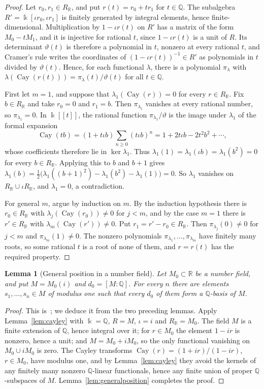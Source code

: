 \documentclass[10pt]{article}
\newtheorem{lem}[thm]{Lemma}
\theoremstyle{remark}
\newcommand{\R}{\mathbb R}
\newcommand{\Q}{\mathbb Q}
\DeclareMathOperator{\Cay}{Cay}
\begin{document}
\begin{proof}
Let $r_0,r_1\in R_\R$, and put $r(t)=r_0+tr_1$ for $t\in\Q$. The subalgebra $R'=\Bbbk[\iota r_0,\iota r_1]$ is finitely generated by integral elements, hence finite-dimensional. Multiplication by $1-\iota r(t)$ on $R'$ has a matrix of the form $M_0-tM_1$, and it is injective for rational $t$, since $1-\iota r(t)$ is a unit of $R$. Its determinant $\vartheta(t)$ is therefore a polynomial in $t$, nonzero at every rational $t$, and Cramer's rule writes the coordinates of $(1-\iota r(t))^{-1}\in R'$ as polynomials in $t$ divided by $\vartheta(t)$. Hence, for each functional $\lambda$, there is a polynomial $\pi_\lambda$ with $\lambda(\Cay(r(t)))=\pi_\lambda(t)/\vartheta(t)$ for all $t\in\Q$.

First let $m=1$, and suppose that $\lambda_1(\Cay(r))=0$ for every $r\in R_\R$. Fix $b\in R_\R$ and take $r_0=0$ and $r_1=b$. Then $\pi_{\lambda_1}$ vanishes at every rational number, so $\pi_{\lambda_1}=0$. In $\Bbbk[[t]]$, the rational function $\pi_{\lambda_1}/\vartheta$ is the image under $\lambda_1$ of the formal expansion
\[
 \Cay(tb)=(1+t\iota b)\sum_{n\ge0}(t\iota b)^n=1+2t\iota b-2t^2b^2+\cdots,
\]
whose coefficients therefore lie in $\ker\lambda_1$. Thus $\lambda_1(1)=\lambda_1(\iota b)=\lambda_1(b^2)=0$ for every $b\in R_\R$. Applying this to $b$ and $b+1$ gives $\lambda_1(b)=\frac12\bigl(\lambda_1((b+1)^2)-\lambda_1(b^2)-\lambda_1(1)\bigr)=0$. So $\lambda_1$ vanishes on $R_\R\cup\iota R_\R$, and $\lambda_1=0$, a contradiction.

For general $m$, argue by induction on $m$. By the induction hypothesis there is $r_0\in R_\R$ with $\lambda_j(\Cay(r_0))\ne0$ for $j<m$, and by the case $m=1$ there is $r'\in R_\R$ with $\lambda_m(\Cay(r'))\ne0$. Put $r_1=r'-r_0\in R_\R$. Then $\pi_{\lambda_j}(0)\ne0$ for $j<m$ and $\pi_{\lambda_m}(1)\ne0$. The nonzero polynomials $\pi_{\lambda_1},\ldots,\pi_{\lambda_m}$ have finitely many roots, so some rational $t$ is a root of none of them, and $r=r(t)$ has the required property.
\end{proof}


\begin{lem}[General position in a number field]\label{lem:numberfield}
Let $M_0\subset\R$ be a number field, and put $M=M_0(i)$ and $d_0=[M:\Q]$. For every $n$ there are elements $s_1,\ldots,s_n\in M$ of modulus one such that every $d_0$ of them form a $\Q$-basis of $M$.
\end{lem}

\begin{proof}
This is~\cite[Lemma~3.4]{OAI}; we deduce it from the two preceding lemmas. Apply Lemma~\ref{lem:cayley} with $\Bbbk=\Q$, $R=M$, $\iota=i$ and $R_\R=M_0$. The field $M$ is a finite extension of $\Q$, hence integral over it; for $r\in M_0$ the element $1-ir$ is nonzero, hence a unit; and $M=M_0+iM_0$, so the only functional vanishing on $M_0\cup iM_0$ is zero. The Cayley transforms $\Cay(r)=(1+ir)/(1-ir)$, $r\in M_0$, have modulus one, and by Lemma~\ref{lem:cayley} they avoid the kernels of any finitely many nonzero $\Q$-linear functionals, hence any finite union of proper $\Q$-subspaces of $M$. Lemma~\ref{lem:generalposition} completes the proof.
\end{proof}
\end{document}
